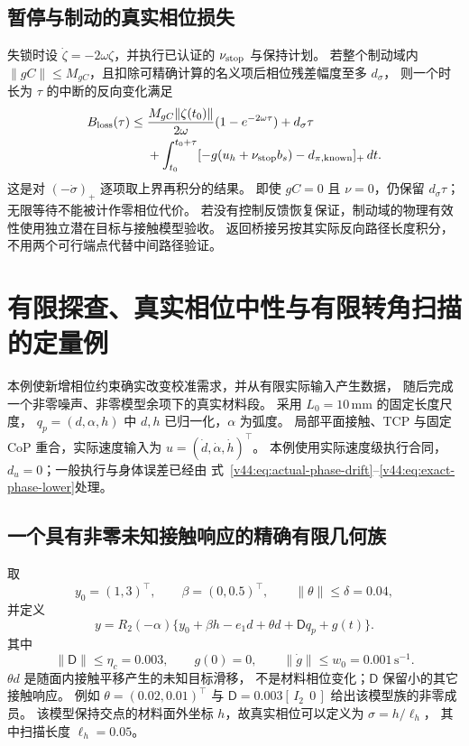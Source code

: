 \documentclass[11pt,a4paper]{article}
\numberwithin{equation}{section}
\theoremstyle{definition}
\begin{document}
\subsection{暂停与制动的真实相位损失}
失锁时设 $\dot\zeta=-2\omega\zeta$，并执行已认证的 $\nu_{\rm stop}$ 与保持计划。
若整个制动域内 $\|gC\|\le M_{gC}$，且扣除可精确计算的名义项后相位残差幅度至多 $d_\sigma$，
则一个时长为 $\tau$ 的中断的反向变化满足
\begin{align}
 B_{\rm loss}(\tau)
 \le{}&\frac{M_{gC}\|\zeta(t_0)\|}{2\omega}
                   (1-e^{-2\omega\tau})+d_\sigma\tau\\
 &+\int_{t_0}^{t_0+\tau}
       [-g(u_h+\nu_{\rm stop}b_s)-d_{\pi,\rm known}]_+\,dt.
 \label{v44:eq:loss-phase-budget}
\end{align}
这是对 $(-\dot\sigma)_+$ 逐项取上界再积分的结果。
即使 $gC=0$ 且 $\nu=0$，仍保留 $d_\sigma\tau$；
无限等待不能被计作零相位代价。
若没有控制反馈恢复保证，制动域的物理有效性使用独立潜在目标与接触模型验收。
返回桥接另按其实际反向路径长度积分，不用两个可行端点代替中间路径验证。



\section{有限探查、真实相位中性与有限转角扫描的定量例}
\label{v44:sec:finite-geometry-example}

本例使新增相位约束确实改变校准需求，并从有限实际输入产生数据，
随后完成一个非零噪声、非零模型余项下的真实材料段。
采用 $L_0=10\,\mathrm{mm}$ 的固定长度尺度，
$q_p=(d,\alpha,h)$ 中 $d,h$ 已归一化，$\alpha$ 为弧度。
局部平面接触、TCP 与固定 CoP 重合，实际速度输入为
$u=(\dot d,\dot\alpha,\dot h)^\top$。
本例使用实际速度级执行合同，$d_u=0$；一般执行与身体误差已经由
式~\eqref{v44:eq:actual-phase-drift}--\eqref{v44:eq:exact-phase-lower}处理。

\subsection{一个具有非零未知接触响应的精确有限几何族}
取
\begin{equation}
 y_0=(1,3)^\top,\qquad \beta=(0,0.5)^\top,
 \qquad \|\theta\|\le\delta=0.04,
 \label{v44:eq:geometry-parameters}
\end{equation}
并定义
\begin{equation}
 \boxed{y=R_2(-\alpha)
 \{y_0+\beta h-e_1d+\theta d+\mathsf Dq_p+g(t)\}.}
 \label{v44:eq:finite-exact-geometry}
\end{equation}
其中
\begin{equation}
 \|\mathsf D\|\le\eta_c=0.003,\qquad g(0)=0,
 \qquad\|\dot g\|\le w_0=0.001\,\mathrm{s}^{-1}.
 \label{v44:eq:geometry-remainder}
\end{equation}
$\theta d$ 是随面内接触平移产生的未知目标滑移，
不是材料相位变化；$\mathsf D$ 保留小的其它接触响应。
例如 $\theta=(0.02,0.01)^\top$ 与 $\mathsf D=0.003[\,I_2\ \ 0\,]$
给出该模型族的非零成员。
该模型保持交点的材料面外坐标 $h$，故真实相位可以定义为 $\sigma=h/\ell_h$，
其中扫描长度 $\ell_h=0.05$。
\end{document}

